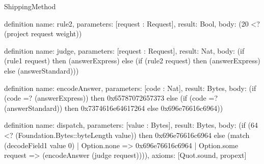 \begin{lexlean}{ShippingMethod}
\begin{semanticmodule}
definition{
  name: rule2,
  parameters: [request : Request],
  result: Bool,
  body: (20 <? (project request weight))
}

definition{
  name: judge,
  parameters: [request : Request],
  result: Nat,
  body: (if (rule1 request) then (answerExpress) else (if (rule2 request) then (answerExpress) else (answerStandard)))
}

definition{
  name: encodeAnswer,
  parameters: [code : Nat],
  result: Bytes,
  body: (if (code =? (answerExpress)) then 0x65787072657373 else (if (code =? (answerStandard)) then 0x7374616e64617264 else 0x696e76616c6964))
}

definition{
  name: dispatch,
  parameters: [value : Bytes],
  result: Bytes,
  body: (if (64 <? (Foundation.Bytes::byteLength value)) then 0x696e76616c6964 else (match (decodeField1 value 0)
    | Option.none => 0x696e76616c6964
    | Option.some request => (encodeAnswer (judge request)))),
  axioms: [Quot.sound, propext]
}


\end{semanticmodule}
\end{lexlean}
